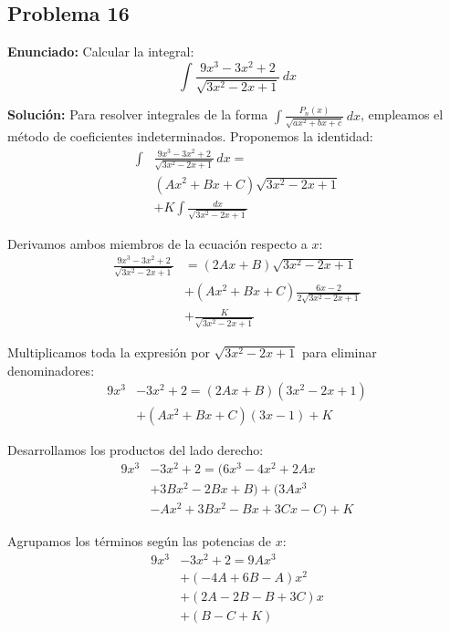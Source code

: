 \subsection*{Problema 16}
\textbf{Enunciado:} Calcular la integral:
\begin{equation*}
\int \frac{9x^3 - 3x^2 + 2}{\sqrt{3x^2 - 2x + 1}} \, dx
\end{equation*}

\textbf{Solución:} Para resolver integrales de la forma $\int \frac{P_n(x)}{\sqrt{ax^2+bx+c}} \, dx$, empleamos el método de coeficientes indeterminados. Proponemos la identidad:
\begin{align*}
\int &\frac{9x^3 - 3x^2 + 2}{\sqrt{3x^2 - 2x + 1}} \, dx = \\
&(Ax^2 + Bx + C)\sqrt{3x^2 - 2x + 1} \\
&+ K \int \frac{dx}{\sqrt{3x^2 - 2x + 1}}
\end{align*}

Derivamos ambos miembros de la ecuación respecto a $x$:
\begin{align*}
\frac{9x^3 - 3x^2 + 2}{\sqrt{3x^2 - 2x + 1}} &= (2Ax + B)\sqrt{3x^2 - 2x + 1} \\
&+ (Ax^2 + Bx + C)\frac{6x - 2}{2\sqrt{3x^2 - 2x + 1}} \\
&+ \frac{K}{\sqrt{3x^2 - 2x + 1}}
\end{align*}

Multiplicamos toda la expresión por $\sqrt{3x^2 - 2x + 1}$ para eliminar denominadores:
\begin{align*}
9x^3 &- 3x^2 + 2 = (2Ax + B)(3x^2 - 2x + 1) \\
&+ (Ax^2 + Bx + C)(3x - 1) + K
\end{align*}

Desarrollamos los productos del lado derecho:
\begin{align*}
9x^3 &- 3x^2 + 2 = (6x^3 - 4x^2 + 2Ax \\
&+ 3Bx^2 - 2Bx + B) + (3Ax^3 \\
&- Ax^2 + 3Bx^2 - Bx + 3Cx - C) + K
\end{align*}

Agrupamos los términos según las potencias de $x$:
\begin{align*}
9x^3 &- 3x^2 + 2 = 9Ax^3 \\
&+ (-4A + 6B - A)x^2 \\
&+ (2A - 2B - B + 3C)x \\
&+ (B - C + K)
\end{align*}

